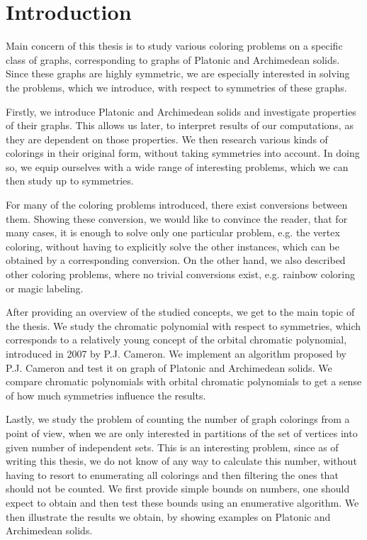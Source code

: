 \chapter*{Introduction}

\begin{highlight}
Main concern of this thesis is to study various coloring problems on a specific class of graphs, corresponding to graphs of Platonic and Archimedean solids. Since these graphs are highly symmetric, we are especially interested in solving the problems, which we introduce, with respect to symmetries of these graphs.

Firstly, we introduce Platonic and Archimedean solids and investigate properties of their graphs. This allows us later, to interpret results of our computations, as they are dependent on those properties. We then research various kinds of colorings in their original form, without taking symmetries into account. In doing so, we equip ourselves with a wide range of interesting problems, which we can then study up to symmetries. 

For many of the coloring problems introduced, there exist conversions between them. Showing these conversion, we would like to convince the reader, that for many cases, it is enough to solve only one particular problem, e.g. the vertex coloring, without having to explicitly solve the other instances, which can be obtained by a corresponding conversion. On the other hand, we also described other coloring problems, where no trivial conversions exist, e.g. rainbow coloring or magic labeling.

After providing an overview of the studied concepts, we get to the main topic of the thesis. We study the chromatic polynomial with respect to symmetries, which corresponds to a relatively young concept of the orbital chromatic polynomial, introduced in 2007 by P.J. Cameron. We implement an algorithm proposed by P.J. Cameron and test it on graph of Platonic and Archimedean solids. We compare chromatic polynomials with orbital chromatic polynomials to get a sense of how much symmetries influence the results.

Lastly, we study the problem of counting the number of graph colorings from a point of view, when we are only interested in partitions of the set of vertices into given number of independent sets. This is an interesting problem, since as of writing this thesis, we do not know of any way to calculate this number, without having to resort to enumerating all colorings and then filtering the ones that should not be counted. We first provide simple bounds on numbers, one should expect to obtain and then test these bounds using an enumerative algorithm. We then illustrate the results we obtain, by showing examples on Platonic and Archimedean solids.
\end{highlight}